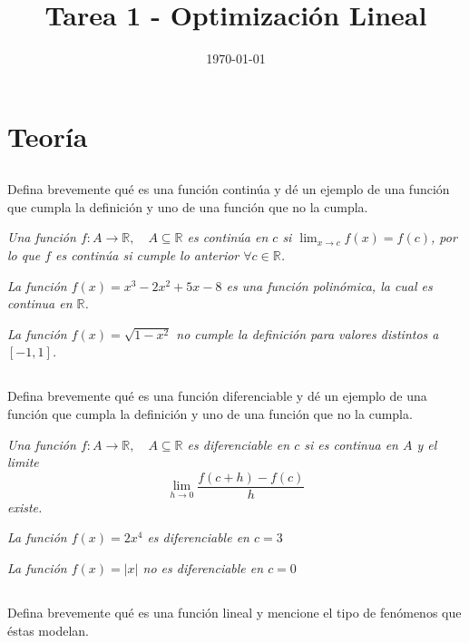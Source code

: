 \documentclass[12pt,oneside]{book}
\title{Tarea 1 - Optimización Lineal}
\author{}
\date{\today}
\providecommand{\abs}[1]{\lvert#1\rvert}
\begin{document}
\maketitle

\tableofcontents

\chapter{Teoría}

\section[Ejercicio]{}
{\large Defina brevemente qué 
es una función continúa 
y dé un ejemplo de una función que cumpla 
la definición y uno de una función que no la cumpla.}

\textit{Una función $f:A \rightarrow \mathbb{R}, \quad A \subseteq \mathbb{R}$ es continúa en $c$ si $\lim_{x \rightarrow c} f(x) = f(c)$, por lo que $f$ es continúa si cumple lo anterior $\forall c \in \mathbb{R}$.}

\textit{La función $f(x) = x^3-2x^2+5x-8$ es una función polinómica, la cual es continua en $\mathbb{R}$.}

\textit{La función $f(x) = \sqrt{1-x^2}$ no cumple la definición para valores distintos a $[-1,1]$.}

\section[Ejercicio]{}
{\large Defina brevemente qué es una función diferenciable y dé un ejemplo de una
función que cumpla la definición y uno de una función que no la cumpla.}

\textit{Una función $f:A \rightarrow \mathbb{R}, \quad A \subseteq \mathbb{R}$ es diferenciable en $c$ si es continua en $A$ y el limite}
\begin{equation*}
    \lim_{h \rightarrow 0} \frac{f(c+h)-f(c)}{h}
\end{equation*}
\textit{existe.}

\textit{La función $f(x) = 2x^4$  es diferenciable en $c = 3$}

\textit{La función $f(x) = \abs{x}$ no es diferenciable en $c = 0$}

\newpage

\section[Ejercicio]{}
{\large Defina brevemente qué es una función lineal y mencione el tipo de fenómenos que éstas modelan.}
\end{document}
